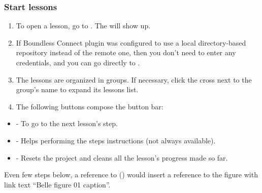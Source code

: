 \documentclass[a4paper,10pt,french]{sphinxmanual}
\begin{document}
\subsubsection{Start lessons}
\label{\detokenize{docs/tuts/autocad-tut01:start-lessons}}\begin{enumerate}
\item {} 
To open a lesson, go to . The  will show up.
\begin{figure}[htbp]
\centering

\noindent{}
\end{figure}

\item {} 
If Boundless Connect plugin was configured to use a local directory-based repository instead of the remote one, then you don't need to enter any credentials, and you can go directly to .

\item {} 
The lessons are organized in groups. If necessary, click the cross next to the group's name to expand its lessons list.

\item {} 
The following buttons compose the button bar:

\end{enumerate}
\begin{itemize}
\item {} 
 - To go to the next lesson's step.

\item {} 
 - Helps performing the steps instructions (not always available).

\item {} 
 - Resets the project and cleans all the lesson's progress made so far.

\end{itemize}

Even few steps below, a reference to {\hyperref[\detokenize{docs/tuts/autocad-tut01:my-figure}]{}} () would insert a reference to the figure with link text “Belle figure 01 caption”.
\end{document}
